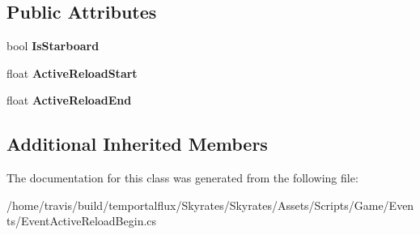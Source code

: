 \subsection*{Public Attributes}
\begin{DoxyCompactItemize}
\item 
\hypertarget{class_skyrates_1_1_game_1_1_event_1_1_event_active_reload_begin_a40b19714009a3e66bad1fefb336bd3a8}{bool {\bfseries Is\-Starboard}}\label{class_skyrates_1_1_game_1_1_event_1_1_event_active_reload_begin_a40b19714009a3e66bad1fefb336bd3a8}

\item 
\hypertarget{class_skyrates_1_1_game_1_1_event_1_1_event_active_reload_begin_ade0019d9eb779017165af7d270a00de0}{float {\bfseries Active\-Reload\-Start}}\label{class_skyrates_1_1_game_1_1_event_1_1_event_active_reload_begin_ade0019d9eb779017165af7d270a00de0}

\item 
\hypertarget{class_skyrates_1_1_game_1_1_event_1_1_event_active_reload_begin_af1ee2f3524988684e85f015955941dc2}{float {\bfseries Active\-Reload\-End}}\label{class_skyrates_1_1_game_1_1_event_1_1_event_active_reload_begin_af1ee2f3524988684e85f015955941dc2}

\end{DoxyCompactItemize}
\subsection*{Additional Inherited Members}


The documentation for this class was generated from the following file\-:\begin{DoxyCompactItemize}
\item 
/home/travis/build/temportalflux/\-Skyrates/\-Skyrates/\-Assets/\-Scripts/\-Game/\-Events/Event\-Active\-Reload\-Begin.\-cs\end{DoxyCompactItemize}
